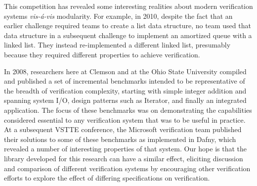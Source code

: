This competition has revealed some interesting realities about modern verification systems \emph{vis-\'{a}-vis} modularity.  For example, in 2010, despite the fact that an earlier challenge required teams to create a list data structure, no team used that data structure in a subsequent challenge to implement an amortized queue with a linked list.  They instead re-implemented a different linked list, presumably because they required different properties to achieve verification.

In 2008, researchers here at Clemson and at the Ohio State University compiled and published\cite{Benchmarks} a set of incremental benchmarks intended to be representative of the breadth of verification complexity, starting with simple integer addition and spanning system I/O, design patterns such as Iterator, and finally an integrated application.  The focus of these benchmarks was on demonstrating the capabilities considered essential to any verification system that was to be useful in practice.  At a subsequent VSTTE conference, the Microsoft verification team published their solutions to some of these benchmarks as implemented in Dafny\cite{DafnySolutions}, which revealed a number of interesting properties of that system.  Our hope is that the library developed for this research can have a similar effect, eliciting discussion and comparison of different verification systems by encouraging other verification efforts to explore the effect of differing specifications on verification.
